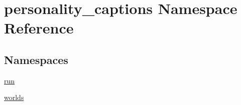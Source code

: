 \hypertarget{namespacepersonality__captions}{}\section{personality\+\_\+captions Namespace Reference}
\label{namespacepersonality__captions}
\subsection*{Namespaces}
\begin{DoxyCompactItemize}
\item 
 \hyperlink{namespacepersonality__captions_1_1run}{run}
\item 
 \hyperlink{namespacepersonality__captions_1_1worlds}{worlds}
\end{DoxyCompactItemize}
